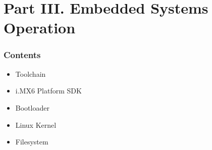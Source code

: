 \section{Part III. Embedded Systems Operation}

\begin{frame}
  \frametitle{Contents}
  \begin{itemize}
  \item Toolchain
  \item i.MX6 Platform SDK
  \item Bootloader
  \item Linux Kernel
  \item Filesystem
  \end{itemize}
\end{frame}

